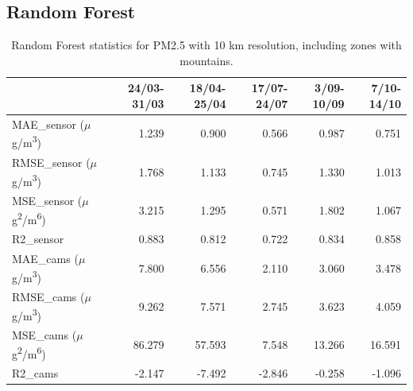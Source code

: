 \subsection{Random Forest}
\begin{table}[H]
\begin{tabular}{lrrrrr}
\toprule
 &  24/03-31/03 &  18/04-25/04 &  17/07-24/07 &  3/09-10/09 &  7/10-14/10 \\
\midrule
 MAE\_sensor ($\mu$g/m\textsuperscript{3})&        1.239 &        0.900 &        0.566 &       0.987 &       0.751 \\
RMSE\_sensor ($\mu$g/m\textsuperscript{3})&        1.768 &        1.133 &        0.745 &       1.330 &       1.013 \\
 MSE\_sensor ($\mu$g\textsuperscript{2}/m\textsuperscript{6})&        3.215 &        1.295 &        0.571 &       1.802 &       1.067 \\
  R2\_sensor &        0.883 &        0.812 &        0.722 &       0.834 &       0.858 \\
   MAE\_cams ($\mu$g/m\textsuperscript{3})&        7.800 &        6.556 &        2.110 &       3.060 &       3.478 \\
  RMSE\_cams ($\mu$g/m\textsuperscript{3})&        9.262 &        7.571 &        2.745 &       3.623 &       4.059 \\
   MSE\_cams ($\mu$g\textsuperscript{2}/m\textsuperscript{6})&       86.279 &       57.593 &        7.548 &      13.266 &      16.591 \\
    R2\_cams &       -2.147 &       -7.492 &       -2.846 &      -0.258 &      -1.096 \\
\bottomrule
\end{tabular}
\caption{Random Forest statistics for PM2.5 with 10 km resolution, including zones with mountains.}
\end{table}
